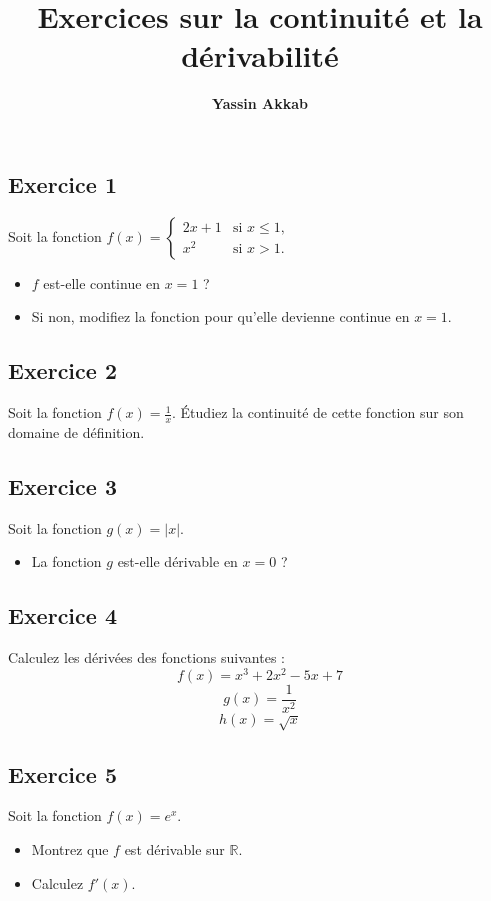 \documentclass{article}
\title{\textbf{Exercices sur la continuité et la dérivabilité}}
\author{\textbf{Yassin Akkab}}
\begin{document}
	
	\maketitle
	

	
	\subsection*{Exercice 1}
	Soit la fonction \( f(x) = 
	\begin{cases}
		2x + 1 & \text{si } x \leq 1, \\
		x^2 & \text{si } x > 1.
	\end{cases}
	\)
	\begin{itemize}
		\item \( f \) est-elle continue en \( x = 1 \) ?
		\item Si non, modifiez la fonction pour qu'elle devienne continue en \( x = 1 \).
	\end{itemize}
	
	\subsection*{Exercice 2}
	Soit la fonction \( f(x) = \frac{1}{x} \). Étudiez la continuité de cette fonction sur son domaine de définition.
	
	\subsection*{Exercice 3}
	Soit la fonction \( g(x) = |x| \). 
	\begin{itemize}
		\item La fonction \( g \) est-elle dérivable en \( x = 0 \) ?
	
	\end{itemize}
	
	\subsection*{Exercice 4}
	Calculez les dérivées des fonctions suivantes :
	\[
	f(x) = x^3 + 2x^2 - 5x + 7
	\]
	\[
	g(x) = \frac{1}{x^2}
	\]
	\[
	h(x) = \sqrt{x}
	\]
	
	\subsection*{Exercice 5}
	Soit la fonction \( f(x) = e^x \). 
	\begin{itemize}
		\item Montrez que \( f \) est dérivable sur \( \mathbb{R} \).
		\item Calculez \( f'(x) \).
	\end{itemize}
	
\end{document}

